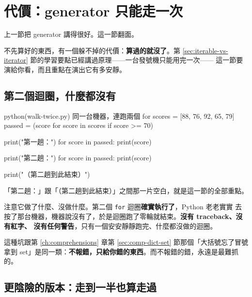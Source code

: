 \section{代價：generator 只能走一次}
\label{sec:one-shot}

上一節把 generator 講得很好。這一節翻面。

不先算好的東西，有一個躲不掉的代價：\textbf{算過的就沒了}。第
\ref{sec:iterable-vs-iterator} 節的學習要點已經講過原理——一台發號機只能用完一次——
這一節要演給你看，而且重點在演出它有多安靜。

\subsection*{第二個迴圈，什麼都沒有}

\begin{example}{python}{(walk-twice.py) 同一台機器，連跑兩個 for}
scores = [88, 76, 92, 65, 79]
passed = (score for score in scores if score >= 70)

print("第一趟：")
for score in passed:
    print(score)

print("第二趟：")
for score in passed:
    print(score)

print("（第二趟到此結束）")
\end{example}


「第二趟：」跟「（第二趟到此結束）」之間那一片空白，就是這一節的全部重點。

注意它做了什麼、沒做什麼。第二個 \texttt{for} 迴圈\textbf{確實執行了}，Python 老老實實
去按了那台機器，機器說沒有了，於是迴圈跑了零輪就結束。\textbf{沒有 traceback、沒有紅字、
沒有任何警告}，只有一個安安靜靜跑完、什麼都沒做的迴圈。

這種坑跟第 \ref{ch:comprehensions} 章第 \ref{sec:comp-dict-set} 節那個「大括號忘了冒號
拿到 set」是同一類：\textbf{不報錯，只給你錯的東西}。而不報錯的錯，永遠是最難抓的。

\subsection*{更陰險的版本：走到一半也算走過}

